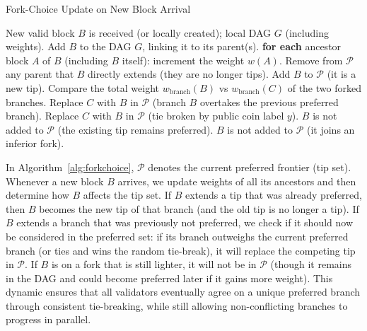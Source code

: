 \begin{algorithm}[t]
\caption{Fork-Choice Update on New Block Arrival}\label{alg:forkchoice}
\begin{algorithmic}[1]
\Require New valid block $B$ is received (or locally created); local DAG $G$ (including weights).
\State Add $B$ to the DAG $G$, linking it to its parent(s). 
\State \textbf{for each} ancestor block $A$ of $B$ (including $B$ itself): increment the weight $w(A)$.
\State Remove from $\mathcal{P}$ any parent that $B$ directly extends (they are no longer tips).
    \State Add $B$ to $\mathcal{P}$ (it is a new tip).
    \State Compare the total weight $w_{\text{branch}}(B)$ vs $w_{\text{branch}}(C)$ of the two forked branches.
        \State Replace $C$ with $B$ in $\mathcal{P}$ (branch $B$ overtakes the previous preferred branch).
            \State Replace $C$ with $B$ in $\mathcal{P}$ (tie broken by public coin label $y$).
        \Else 
            \State $B$ is not added to $\mathcal{P}$ (the existing tip remains preferred).
        \EndIf
    \Else 
        \State $B$ is not added to $\mathcal{P}$ (it joins an inferior fork).
    \EndIf
\EndIf
\end{algorithmic}
\end{algorithm}

\noindent In Algorithm~\ref{alg:forkchoice}, $\mathcal{P}$ denotes the current preferred frontier (tip set). Whenever a new block $B$ arrives, we update weights of all its ancestors and then determine how $B$ affects the tip set. If $B$ extends a tip that was already preferred, then $B$ becomes the new tip of that branch (and the old tip is no longer a tip). If $B$ extends a branch that was previously not preferred, we check if it should now be considered in the preferred set: if its branch outweighs the current preferred branch (or ties and wins the random tie-break), it will replace the competing tip in $\mathcal{P}$. If $B$ is on a fork that is still lighter, it will not be in $\mathcal{P}$ (though it remains in the DAG and could become preferred later if it gains more weight). This dynamic ensures that all validators eventually agree on a unique preferred branch through consistent tie-breaking, while still allowing non-conflicting branches to progress in parallel.

